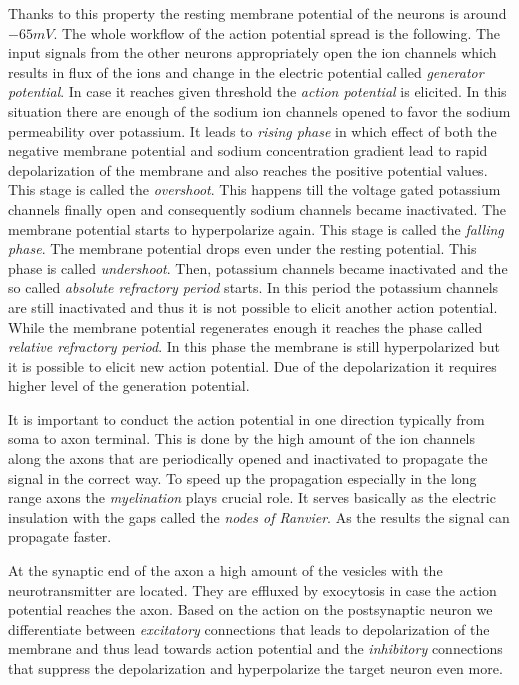 Thanks to this property the resting membrane potential of the neurons is around $-65 mV$.
The whole workflow of the action potential spread is the following. The input signals
from the other neurons appropriately open the ion channels which results in flux
of the ions and change in the electric potential called \emph{generator potential}.
In case it reaches given threshold the \emph{action potential} is elicited. In this
situation there are enough of the sodium ion channels opened to favor the sodium
permeability over potassium. It leads to \emph{rising phase} in which effect of both 
the negative membrane potential and sodium concentration gradient lead to rapid
depolarization of the membrane and also reaches the positive potential values.
This stage is called the \emph{overshoot}. This happens till the voltage
gated potassium channels finally open and consequently sodium channels became
inactivated. The membrane potential starts to hyperpolarize again. This stage is
called the \emph{falling phase}. The membrane potential drops even under the 
resting potential. This phase is called \emph{undershoot}. Then, potassium 
channels became inactivated and the so called \emph{absolute refractory period} 
starts. In this period the potassium channels are still inactivated and 
thus it is not possible to elicit another action potential. While the 
membrane potential regenerates enough it reaches the phase called 
\emph{relative refractory period}. In this phase the membrane is still 
hyperpolarized but it is possible to elicit new action potential. Due
of the depolarization it requires higher level of the generation potential.

It is important to conduct the action potential in one direction typically
from soma to axon terminal. This is done by the high amount of the 
ion channels along the axons that are periodically opened and inactivated
to propagate the signal in the correct way. To speed up the propagation especially
in the long range axons the \emph{myelination} plays crucial role. It serves basically
as the electric insulation with the gaps called the \emph{nodes of Ranvier}. As the 
results the signal can propagate faster.

At the synaptic end of the axon a high amount of the vesicles with the neurotransmitter
are located. They are effluxed by exocytosis in case the action potential reaches the axon.
Based on the action on the postsynaptic neuron we differentiate between \emph{excitatory}
connections that leads to depolarization of the membrane and thus lead towards
action potential and the \emph{inhibitory} connections that suppress the depolarization
and hyperpolarize the target neuron even more.

